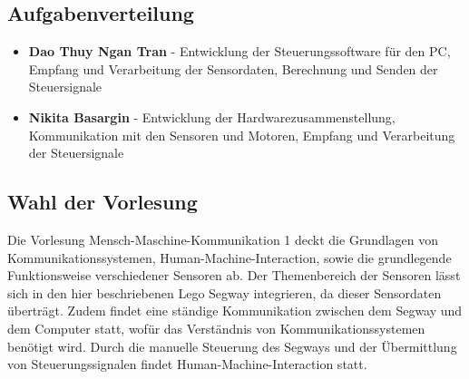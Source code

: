 \documentclass[german,11pt,a4paper]{netforms}
\begin{document}


\subsection*{Aufgabenverteilung}
\begin{itemize}
\item \textbf{Dao Thuy Ngan Tran} - Entwicklung der Steuerungssoftware für den PC, Empfang und Verarbeitung der Sensordaten, Berechnung und Senden der Steuersignale
\item \textbf{Nikita Basargin} - Entwicklung der Hardwarezusammenstellung, Kommunikation mit den Sensoren und Motoren, Empfang und Verarbeitung der Steuersignale
\end{itemize}

\subsection*{Wahl der Vorlesung}
Die Vorlesung Mensch-Maschine-Kommunikation 1 deckt die Grundlagen von Kommunikationssystemen, Human-Machine-Interaction, sowie die grundlegende Funktionsweise verschiedener Sensoren ab. Der Themenbereich der Sensoren lässt sich in den hier beschriebenen Lego Segway integrieren, da dieser Sensordaten überträgt. Zudem findet eine ständige Kommunikation zwischen dem Segway und dem Computer statt, wofür das Verständnis von Kommunikationssystemen benötigt wird. Durch die manuelle Steuerung des Segways und der Übermittlung von Steuerungssignalen findet Human-Machine-Interaction statt. 
\end{document}
